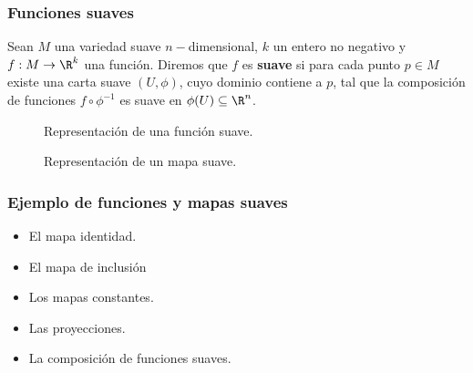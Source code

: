\begin{frame}
	\frametitle{Funciones suaves}
	\begin{definition}
		Sean $M$ una variedad suave  $n-$dimensional, $k$ un entero no negativo y $f: M \to \R^{k}$ una función. Diremos que $f$ es \textbf{suave} si para cada punto $p \in M$ existe una carta suave $(U,\phi)$, cuyo dominio contiene a $p$, tal que la composición de funciones $f \circ \phi^{-1}$ es suave en $\phi(U) \subseteq \R^{n}$.
	\end{definition}
	\begin{figure}
		\scalebox{0.6}{}
		\caption{Representación de una función suave.}
	\end{figure}
\end{frame}

\begin{frame}
	\begin{figure}
		\scalebox{.70}{}
		\caption{Representación de un mapa suave.}
	\end{figure}
\end{frame}

\begin{frame}
	\frametitle{Ejemplo de funciones y mapas suaves}
	\begin{itemize}
		\item El mapa identidad.
		\item El mapa de inclusión
		\item Los mapas constantes.
		\item Las proyecciones.
		\item La composición de funciones suaves.
	\end{itemize}
\end{frame}
